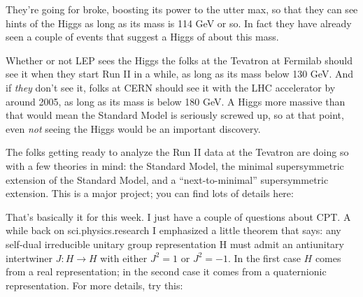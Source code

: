 \documentclass{article}
\def\tightlist{}
\renewcommand{\texttt}[1]{%
  \begingroup
  \ttfamily
  \begingroup\lccode`~=`/\lowercase{\endgroup\def~}{/\discretionary{}{}{}}%
  \begingroup\lccode`~=`[\lowercase{\endgroup\def~}{[\discretionary{}{}{}}%
  \begingroup\lccode`~=`.\lowercase{\endgroup\def~}{.\discretionary{}{}{}}%
  \catcode`/=\active\catcode`[=\active\catcode`.=\active
  \scantokens{#1\noexpand}%
  \endgroup
}
\begin{document}

They're going for broke, boosting its power to the utter max, so that
they can see hints of the Higgs as long as its mass is 114 GeV or so. In
fact they have already seen a couple of events that suggest a Higgs of
about this mass.

Whether or not LEP sees the Higgs the folks at the Tevatron at Fermilab
should see it when they start Run II in a while, as long as its mass
below 130 GeV. And if \emph{they} don't see it, folks at CERN should see
it with the LHC accelerator by around 2005, as long as its mass is below
180 GeV. A Higgs more massive than that would mean the Standard Model is
seriously screwed up, so at that point, even \emph{not} seeing the Higgs
would be an important discovery.

The folks getting ready to analyze the Run II data at the Tevatron are
doing so with a few theories in mind: the Standard Model, the minimal
supersymmetric extension of the Standard Model, and a
``next-to-minimal'' supersymmetric extension. This is a major project;
you can find lots of details here:


That's basically it for this week. I just have a couple of questions
about CPT. A while back on sci.physics.research I emphasized a little
theorem that says: any self-dual irreducible unitary group
representation H must admit an antiunitary intertwiner
\(J\colon H \to H\) with either \(J^2 = 1\) or \(J^2 = -1\). In the
first case \(H\) comes from a real representation; in the second case it
comes from a quaternionic representation. For more details, try this:

\end{document}
